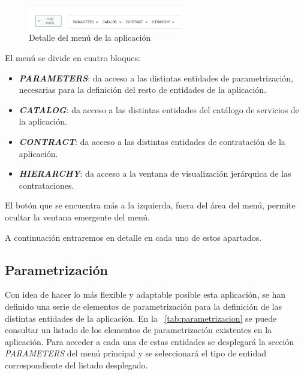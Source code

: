 \begin{figure}[H]
  \centering
  \includegraphics[width=0.6\textwidth]{imaxes/menu-aplicacion.png}
  \caption{Detalle del menú de la aplicación}
  \label{fig:menu}
\end{figure}

El menú se divide en cuatro bloques:
\begin{itemize}
\item \emph{\textbf{PARAMETERS}}: da acceso a las distintas entidades de parametrización, necesarias para la definición del resto de entidades de la aplicación.
\item \emph{\textbf{CATALOG}}: da acceso a las distintas entidades del catálogo de servicios de la aplicación.
\item \emph{\textbf{CONTRACT}}: da acceso a las distintas entidades de contratación de la aplicación.
\item \emph{\textbf{HIERARCHY}}: da acceso a la ventana de visualización jerárquica de las contrataciones.
\end{itemize}

El botón que se encuentra más a la izquierda, fuera del área del menú, permite ocultar la ventana emergente del menú.


A continuación entraremos en detalle en cada uno de estos apartados.

\subsection{Parametrización}
\label{sub:parametrizacion}

Con idea de hacer lo más flexible y adaptable posible esta aplicación, se han definido una serie de elementos de parametrización para la definición de las distintas entidades de la aplicación. En la \tablename~\ref{tab:parametrizacion} se puede consultar un listado de los elementos de parametrización existentes en la aplicación. Para acceder a cada una de estas entidades se desplegará la sección \emph{PARAMETERS} del menú principal y se seleccionará el tipo de entidad correspondiente del listado desplegado.



